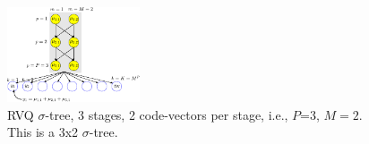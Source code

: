 \documentclass{article}
\begin{document}

								\begin{figure}[t]
								\centering	
								\includegraphics[width=0.35\textwidth]{figs/RVQ_trellis}
								\caption{RVQ $\sigma$-tree, 3 stages, 2 code-vectors per stage, i.e., $P$=3, $M=2$.  This is a 3x2 $\sigma$-tree.} 
								\label{fig:RVQ_sigma_tree}				
								\end{figure}
\end{document}
